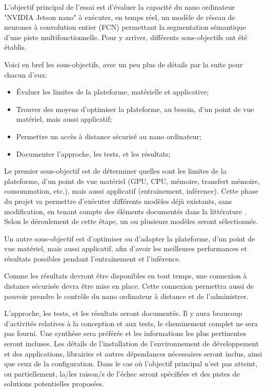 ﻿\par L'objectif principal de l'essai est d'évaluer la capacité du nano ordinateur "NVIDIA Jetson nano" à exécuter, en temps réel, un modèle de réseau de neurones à convolution entier (FCN) permettant la segmentation sémantique d'une piste multifonctionnelle. Pour y arriver, différents sous-objectifs ont été établis. 
\par Voici en bref les sous-objectifs, avec un peu plus de détails par la suite pour chacun d'eux: 
\begin{itemize}
   \item Évaluer les limites de la plateforme, matérielle et applicative; 
   \item Trouver des moyens d'optimiser la plateforme, au besoin, d'un point de vue matériel, mais aussi applicatif; 
   \item Permettre un accès à distance sécurisé au nano ordinateur;
   \item Documenter l'approche, les tests, et les résultats;
\end{itemize}
\vspace{1\baselineskip}
\par Le premier sous-objectif est de déterminer quelles sont les limites de la plateforme, d'un point de vue matériel (GPU, CPU, mémoire, transfert mémoire, consommation, etc.), mais aussi applicatif (entrainement, inférence). Cette phase du projet va permettre d'exécuter différents modèles déjà existants, sans  modification, en tenant compte des éléments documentés dans la littérature \cite{nguyen_mavnet_2019} \cite{zheng_real-time_2020} \cite{nvidia_jetson_2019-1}. Selon le déroulement de cette étape, un ou plusieurs modèles seront sélectionnés. 
\par Un autre sous-objectif est d'optimiser ou d'adapter la plateforme, d'un point de vue matériel, mais aussi applicatif, afin d'avoir les meilleures performances et résultats possibles pendant l'entrainement et l'inférence.
\par Comme les résultats devront être disponibles en tout temps, une connexion à distance sécurisée devra être mise en place. Cette connexion permettra aussi de pouvoir prendre le contrôle du nano ordinateur à distance et de l'administrer.
\par L'approche, les tests, et les résultats seront documentés. Il y aura beaucoup d'activités relatives à la conception et aux tests, le cheminement complet ne sera pas fourni. Une synthèse sera préférée et les informations les plus pertinentes seront incluses. Les détails de l'installation de l'environnement de développement et des applications, librairies et autres dépendances nécessaires seront inclus, ainsi que ceux de la configuration. Dans le cas où l'objectif principal n'est pas atteint, ou partiellement, la/les raison/s de l'échec seront spécifiées et des pistes de solutions potentielles proposées.